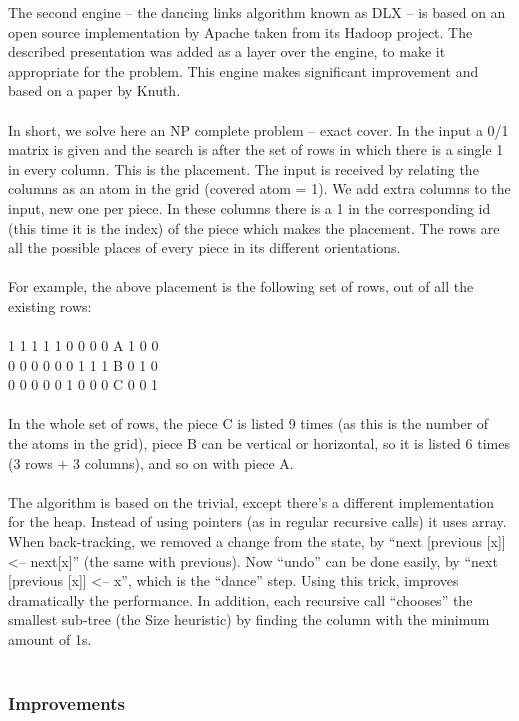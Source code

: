 \documentclass[a4paper,twoside,10pt]{report}
\begin{document}
The second engine – the dancing links algorithm known as DLX – is based on an open source implementation by Apache taken from its Hadoop project. The described presentation was added as a layer over the engine, to make it appropriate for the problem. This engine makes significant improvement and based on a paper by Knuth.
\\\\
In short, we solve here an NP complete problem – exact cover. In the input a 0/1 matrix is given and the search is after the set of rows in which there is a single 1 in every column. This is the placement. The input is received by relating the columns as an atom in the grid (covered atom = 1). We add extra columns to the input, new one per piece. In these columns there is a 1 in the corresponding id (this time it is the index) of the piece which makes the placement. The rows are all the possible places of every piece in its different orientations.
\\\\For example, the above placement is the following set of rows, out of all the existing rows:
\\\\
1 1 1 1 1 0 0 0 0 A 1 0 0
\\
0 0 0 0 0 0 1 1 1 B 0 1 0
\\
0 0 0 0 0 1 0 0 0 C 0 0 1
\\\\
In the whole set of rows, the piece C is listed 9 times (as this is the number of the atoms in the grid), piece B can be vertical or horizontal, so it is listed 6 times (3 rows + 3 columns), and so on with piece A.
\\\\
The algorithm is based on the trivial, except there’s a different implementation for the heap. Instead of using pointers (as in regular recursive calls) it uses array. When back-tracking, we removed a change from the state, by “next [previous [x]] <-- next[x]” (the same with previous). Now “undo” can be done easily, by “next [previous [x]] <-- x”, which is the “dance” step. Using this trick, improves dramatically the performance. In addition, each recursive call “chooses” the smallest sub-tree (the Size heuristic) by finding the column with the minimum amount of 1s.
\\\\
\subsubsection{Improvements}
\end{document}
